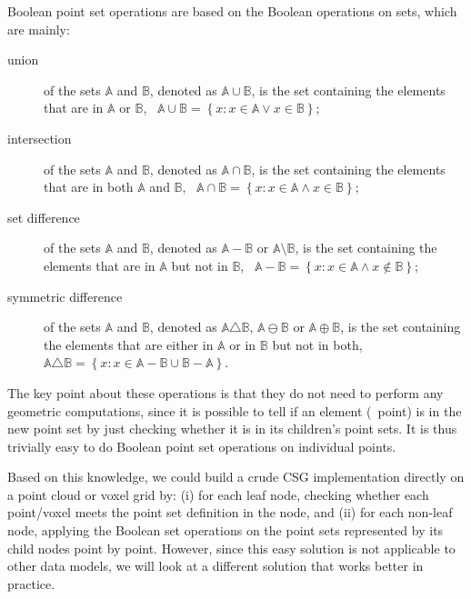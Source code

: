 Boolean point set operations are based on the Boolean operations on sets, which are mainly:

\begin{description}
\item[union] of the sets \(\mathbb{A}\) and \(\mathbb{B}\), denoted as \(\mathbb{A} \cup \mathbb{B}\), is the set containing the elements that are in \(\mathbb{A}\) or \(\mathbb{B}\), \ie\ \( \mathbb{A} \cup \mathbb{B} = \left\{ x : x \in \mathbb{A} \vee x \in \mathbb{B} \right\} \);
\item[intersection] of the sets \(\mathbb{A}\) and \(\mathbb{B}\), denoted as \(\mathbb{A} \cap \mathbb{B}\), is the set containing the elements that are in both \(\mathbb{A}\) and \(\mathbb{B}\), \ie\ \( \mathbb{A} \cap \mathbb{B} = \left\{ x : x \in \mathbb{A} \wedge x \in \mathbb{B} \right\} \);
\item[set difference] of the sets \(\mathbb{A}\) and \(\mathbb{B}\), denoted as \(\mathbb{A} - \mathbb{B}\) or \(\mathbb{A} \setminus \mathbb{B}\), is the set containing the elements that are in \(\mathbb{A}\) but not in \(\mathbb{B}\), \ie\ \( \mathbb{A} - \mathbb{B} = \left\{ x : x \in \mathbb{A} \wedge x \notin \mathbb{B} \right\} \);
\item[symmetric difference] of the sets \(\mathbb{A}\) and \(\mathbb{B}\), denoted as \(\mathbb{A} \triangle \mathbb{B}\), \(\mathbb{A} \ominus \mathbb{B}\) or \(\mathbb{A} \oplus \mathbb{B}\), is the set containing the elements that are either in \(\mathbb{A}\) or in \(\mathbb{B}\) but not in both, \ie\ \( \mathbb{A} \triangle \mathbb{B} = \left\{ x : x \in \mathbb{A} - \mathbb{B} \cup \mathbb{B} - \mathbb{A} \right\} \).
\end{description}

The key point about these operations is that they do not need to perform any geometric computations, since it is possible to tell if an element (\ie\ point) is in the new point set by just checking whether it is in its children's point sets.
It is thus trivially easy to do Boolean point set operations on individual points.

Based on this knowledge, we could build a crude CSG implementation directly on a point cloud or voxel grid by: (i) for each leaf node, checking whether each point/voxel meets the point set definition in the node, and (ii) for each non-leaf node, applying the Boolean set operations on the point sets represented by its child nodes point by point.
However, since this easy solution is not applicable to other data models, we will look at a different solution that works better in practice.

